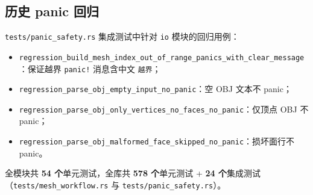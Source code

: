 \documentclass[11pt,a4paper]{article}
\begin{document}
\subsection{历史 panic 回归}

\texttt{tests/panic\_safety.rs} 集成测试中针对 \texttt{io} 模块的回归用例：

\begin{sloppypar}
\begin{itemize}
  \item \texttt{regression\_build\_mesh\_index\_out\_of\_range\_panics\_with\_clear\_message}：保证越界 \texttt{panic!} 消息含中文 \texttt{越界}；
  \item \texttt{regression\_parse\_obj\_empty\_input\_no\_panic}：空 OBJ 文本不 panic；
  \item \texttt{regression\_parse\_obj\_only\_vertices\_no\_faces\_no\_panic}：仅顶点 OBJ 不 panic；
  \item \texttt{regression\_parse\_obj\_malformed\_face\_skipped\_no\_panic}：损坏面行不 panic。
\end{itemize}
\end{sloppypar}

全模块共 \textbf{54 个}单元测试，全库共 \textbf{578 个}单元测试 + \textbf{24 个}集成测试（\texttt{tests/mesh\_workflow.rs} 与 \texttt{tests/panic\_safety.rs}）。
\end{document}
